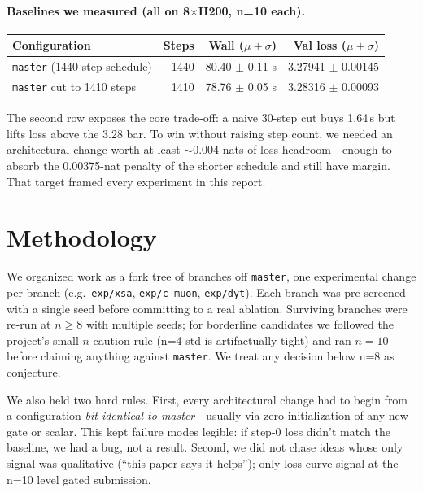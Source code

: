 \documentclass[10pt,letterpaper]{article}
\newcommand{\code}[1]{\texttt{\small #1}}
\begin{document}
\paragraph{Baselines we measured (all on 8\(\times\)H200, n=10 each).}
\begin{center}
\small
\begin{tabular}{lrrr}
\toprule
Configuration & Steps & Wall ($\mu \pm \sigma$) & Val loss ($\mu \pm \sigma$) \\
\midrule
\code{master} (1440-step schedule) & 1440 & 80.40 \(\pm\) 0.11 s & 3.27941 \(\pm\) 0.00145 \\
\code{master} cut to 1410 steps    & 1410 & 78.76 \(\pm\) 0.05 s & 3.28316 \(\pm\) 0.00093 \\
\bottomrule
\end{tabular}
\end{center}

The second row exposes the core trade-off: a naive 30-step cut buys 1.64\,s but lifts loss above the 3.28 bar. To win without raising step count, we needed an architectural change worth at least $\sim$0.004 nats of loss headroom---enough to absorb the 0.00375-nat penalty of the shorter schedule and still have margin. That target framed every experiment in this report.

\section{Methodology}
\label{sec:method}

We organized work as a fork tree of branches off \code{master}, one experimental change per branch (e.g.\ \code{exp/xsa}, \code{exp/c-muon}, \code{exp/dyt}). Each branch was pre-screened with a single seed before committing to a real ablation. Surviving branches were re-run at $n \ge 8$ with multiple seeds; for borderline candidates we followed the project's small-$n$ caution rule (n=4 std is artifactually tight) and ran $n=10$ before claiming anything against \code{master}. We treat any decision below n=8 as conjecture.

We also held two hard rules. First, every architectural change had to begin from a configuration \emph{bit-identical to master}---usually via zero-initialization of any new gate or scalar. This kept failure modes legible: if step-0 loss didn't match the baseline, we had a bug, not a result. Second, we did not chase ideas whose only signal was qualitative (``this paper says it helps''); only loss-curve signal at the n=10 level gated submission.
\end{document}
